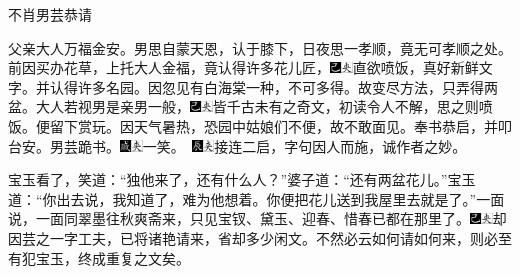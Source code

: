 不肖男芸恭请

父亲大人万福金安。男思自蒙天恩，认于膝下，日夜思一孝顺，竟无可孝顺之处。前因买办花草，上托大人金福，竟认得许多花儿匠，{\includegraphics[width=3mm]{../Images/00003}\includegraphics[width=3mm]{../Images/00012}\footnotesize \kaishu 直欲喷饭，真好新鲜文字。}并认得许多名园。因忽见有白海棠一种，不可多得。故变尽方法，只弄得两盆。大人若视男是亲男一般，{\includegraphics[width=3mm]{../Images/00003}\includegraphics[width=3mm]{../Images/00012}\footnotesize \kaishu 皆千古未有之奇文，初读令人不解，思之则喷饭。}便留下赏玩。因天气暑热，恐园中姑娘们不便，故不敢面见。奉书恭启，并叩台安。男芸跪书。{\includegraphics[width=3mm]{../Images/00005}\includegraphics[width=3mm]{../Images/00012}\footnotesize \kaishu 一笑。　\includegraphics[width=3mm]{../Images/00009}\includegraphics[width=3mm]{../Images/00012}\footnotesize \kaishu 接连二启，字句因人而施，诚作者之妙。}

宝玉看了，笑道：``独他来了，还有什么人？''婆子道：``还有两盆花儿。''宝玉道：``你出去说，我知道了，难为他想着。你便把花儿送到我屋里去就是了。''一面说，一面同翠墨往秋爽斋来，只见宝钗、黛玉、迎春、惜春已都在那里了。{\includegraphics[width=3mm]{../Images/00003}\includegraphics[width=3mm]{../Images/00012}\footnotesize \kaishu 却因芸之一字工夫，已将诸艳请来，省却多少闲文。不然必云如何请如何来，则必至有犯宝玉，终成重复之文矣。}

